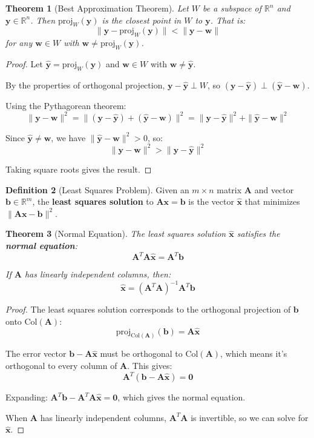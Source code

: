 \documentclass[12pt]{article}
\numberwithin{equation}{section}
\newcommand{\vect}[1]{\boldsymbol{#1}}   %
\newcommand{\mat}[1]{\mathbf{#1}}        %
\theoremstyle{plain}
\newtheorem{theorem}{Theorem}[section]
\theoremstyle{definition}
\newtheorem{definition}[theorem]{Definition}
\theoremstyle{remark}
\begin{document}
\begin{theorem}[Best Approximation Theorem]
Let $W$ be a subspace of $\mathbb{R}^n$ and $\vect{y} \in \mathbb{R}^n$. Then $\text{proj}_W(\vect{y})$ is the closest point in $W$ to $\vect{y}$. That is:
$$\|\vect{y} - \text{proj}_W(\vect{y})\| < \|\vect{y} - \vect{w}\|$$
for any $\vect{w} \in W$ with $\vect{w} \neq \text{proj}_W(\vect{y})$.
\end{theorem}

\begin{proof}
Let $\hat{\vect{y}} = \text{proj}_W(\vect{y})$ and $\vect{w} \in W$ with $\vect{w} \neq \hat{\vect{y}}$.

By the properties of orthogonal projection, $\vect{y} - \hat{\vect{y}} \perp W$, so $(\vect{y} - \hat{\vect{y}}) \perp (\hat{\vect{y}} - \vect{w})$.

Using the Pythagorean theorem:
$$\|\vect{y} - \vect{w}\|^2 = \|(\vect{y} - \hat{\vect{y}}) + (\hat{\vect{y}} - \vect{w})\|^2 = \|\vect{y} - \hat{\vect{y}}\|^2 + \|\hat{\vect{y}} - \vect{w}\|^2$$

Since $\hat{\vect{y}} \neq \vect{w}$, we have $\|\hat{\vect{y}} - \vect{w}\|^2 > 0$, so:
$$\|\vect{y} - \vect{w}\|^2 > \|\vect{y} - \hat{\vect{y}}\|^2$$

Taking square roots gives the result.
\end{proof}

\begin{definition}[Least Squares Problem]
Given an $m \times n$ matrix $\mat{A}$ and vector $\vect{b} \in \mathbb{R}^m$, the \textbf{least squares solution} to $\mat{A}\vect{x} = \vect{b}$ is the vector $\hat{\vect{x}}$ that minimizes $\|\mat{A}\vect{x} - \vect{b}\|^2$.
\end{definition}

\begin{theorem}[Normal Equation]
The least squares solution $\hat{\vect{x}}$ satisfies the \textbf{normal equation}:
$$\mat{A}^T\mat{A}\hat{\vect{x}} = \mat{A}^T\vect{b}$$

If $\mat{A}$ has linearly independent columns, then:
$$\hat{\vect{x}} = (\mat{A}^T\mat{A})^{-1}\mat{A}^T\vect{b}$$
\end{theorem}

\begin{proof}
The least squares solution corresponds to the orthogonal projection of $\vect{b}$ onto $\text{Col}(\mat{A})$:
$$\text{proj}_{\text{Col}(\mat{A})}(\vect{b}) = \mat{A}\hat{\vect{x}}$$

The error vector $\vect{b} - \mat{A}\hat{\vect{x}}$ must be orthogonal to $\text{Col}(\mat{A})$, which means it's orthogonal to every column of $\mat{A}$. This gives:
$$\mat{A}^T(\vect{b} - \mat{A}\hat{\vect{x}}) = \vect{0}$$

Expanding: $\mat{A}^T\vect{b} - \mat{A}^T\mat{A}\hat{\vect{x}} = \vect{0}$, which gives the normal equation.

When $\mat{A}$ has linearly independent columns, $\mat{A}^T\mat{A}$ is invertible, so we can solve for $\hat{\vect{x}}$.
\end{proof}
\end{document}
